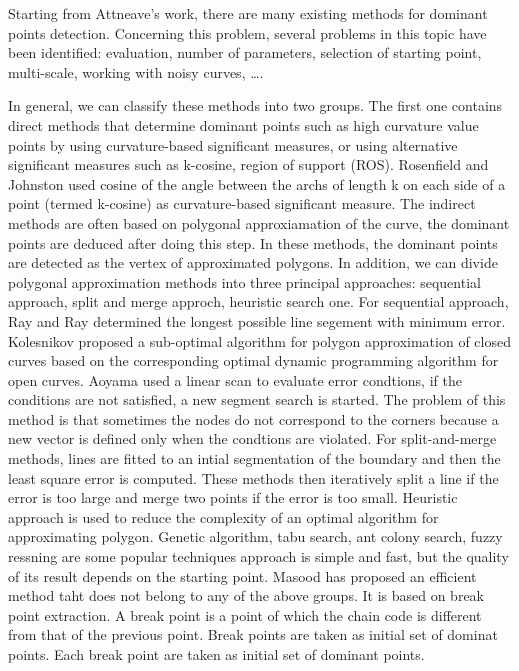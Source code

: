 \documentclass{article}
\begin{document}
Starting from Attneave's work, there are many existing methods for dominant points detection.
Concerning this problem, several problems in this topic have been identified: evaluation, number of
parameters, selection of starting point, multi-scale, working with noisy curves, \dots.

In general, we can classify these methods into two groups.
The first one contains direct methods that determine dominant points such as high curvature
value points by using curvature-based significant measures, or using alternative significant
measures such as k-cosine, region of support (ROS). Rosenfield and Johnston used cosine of the
angle between the archs of length k on each side of a point (termed k-cosine) as curvature-based
significant measure.
The indirect methods are often based on polygonal approxiamation of the curve,
the dominant points are deduced after doing this step.
In these methods, the dominant points are detected as the vertex of approximated polygons.
In addition, we can divide polygonal approximation methods into three principal approaches:
sequential approach, split and merge approch, heuristic search one.
For sequential approach, Ray and Ray determined the longest possible line segement
with minimum error. Kolesnikov proposed a sub-optimal algorithm for polygon
approximation of closed curves based on the corresponding optimal dynamic programming
algorithm for open curves.
Aoyama used a linear scan to evaluate error condtions, if the conditions are not satisfied,
a new segment search is started. The problem of this method is that sometimes the nodes
do not correspond to the corners because a new vector is defined only when the condtions
are violated.
For split-and-merge methods, lines are fitted to an intial segmentation of the boundary
and then the least square error is computed. These methods then iteratively split
a line if the error is too large and merge two points if the error is too small.
Heuristic approach is used to reduce the complexity of an optimal algorithm for approximating
polygon. Genetic algorithm, tabu search, ant colony search, fuzzy ressning are some
popular techniques approach is simple and fast, but the quality of its result depends on the
starting point.
Masood has proposed an efficient method taht does not belong to any of the above groups.
It is based on break point extraction. A break point is a point of which the chain code
is different from that of the previous point. Break points are taken as initial set of
dominat points. Each break point are taken as initial set of dominant points.
\end{document}
